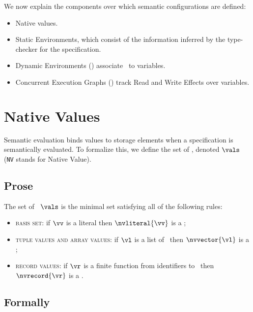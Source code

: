 We now explain the components over which semantic configurations are defined:
\begin{itemize}
    \item Native values.
    \item Static Environments, which consist of the information inferred
            by the type-checker for the specification.
    \item Dynamic Environments () associate \nativevalues\ to variables.
    \item Concurrent Execution Graphs () track Read and Write Effects over variables.
\end{itemize}

\hypertarget{def-vals}{}
\hypertarget{def-nativevalue}{}
\hypertarget{def-nativevalues}{}
\section{Native Values\label{sec:nativevalues}}
Semantic evaluation binds values to storage elements when a specification is semantically evaluated.
To formalize this, we define the set of \emph{\nativevalues}, denoted $\vals$
(\texttt{NV} stands for Native Value).

\subsection{Prose}
The set of \nativevalues\ $\vals$ is the minimal set satisfying all of the following rules:
\begin{itemize}
  \item \textsc{basis set}: if $\vv$ is a literal then $\nvliteral{\vv}$ is a \nativevalue;
  \item \textsc{tuple values and array values}: if $\vl$ is a list of \nativevalues\ then $\nvvector{\vl}$ is a \nativevalue;
  \item \textsc{record values}: if $\vr$ is a finite function from identifiers to \nativevalues\ then $\nvrecord{\vr}$ is a \nativevalue.
\end{itemize}

\subsection{Formally}
\hypertarget{def-nvliteral}{}
\hypertarget{def-nvvector}{}
\hypertarget{def-nvrecord}{}

